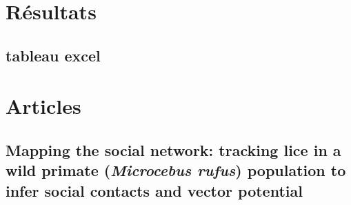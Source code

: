 \section{Résultats}
\subsection{tableau excel}
\lipsum[1]
\section{Articles}
\lipsum[1]
\newpage 
\subsection{Mapping the social network: tracking lice in a wild primate (\textit{Microcebus rufus}) population to infer social contacts and vector potential}


